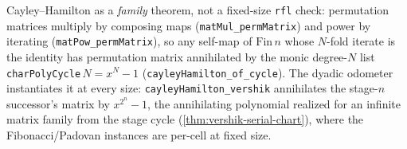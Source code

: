 \begin{theorem}\label{thm:permutation-cayley-hamilton}\leanok{}
Cayley--Hamilton as a \emph{family} theorem, not a fixed-size \texttt{rfl}
check: permutation matrices multiply by composing maps
(\texttt{matMul\_permMatrix}) and power by iterating
(\texttt{matPow\_permMatrix}), so any self-map of $\mathrm{Fin}\,n$ whose
$N$-fold iterate is the identity has permutation matrix annihilated by the
monic degree-$N$ list \texttt{charPolyCycle}$\,N = x^N - 1$
(\texttt{cayleyHamilton\_of\_cycle}). The dyadic odometer instantiates it at
every size: \texttt{cayleyHamilton\_vershik} annihilates the stage-$n$
successor's matrix by $x^{2^n} - 1$, the annihilating polynomial realized
for an infinite matrix family from the stage cycle
(\cref{thm:vershik-serial-chart}), where the Fibonacci/Padovan instances are
per-cell at fixed size.
\end{theorem}
